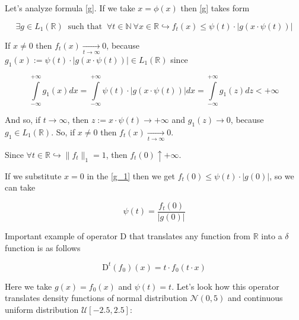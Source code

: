 \documentclass{article}
\begin{document}
    \newpage

    Let's analyze formula \eqref{g}. If we take $x = \phi(x)$ then \eqref{g} takes form 
    
    \begin{equation} \label{g_1}
            \exists g \in L_1(\mathbb{R}) ~\text{ such that }~ \forall t \in \mathbb{N} ~\forall x \in \mathbb{R} \hookrightarrow f_t\left(x\right) \leq \psi(t) \cdot |g(x \cdot \psi(t))|
    \end{equation}

    If $x \neq 0$ then $f_t(x) \underset{t \to \infty}{\longrightarrow} 0$, because $g_1(x) := \psi(t) \cdot |g(x \cdot \psi(t))| \in L_1(\mathbb{R})$ since

    \begin{equation*}
        \int\limits_{-\infty}^{+\infty} g_1(x) dx = \int\limits_{-\infty}^{+\infty} \psi(t) \cdot |g(x \cdot \psi(t))| dx = \int\limits_{-\infty}^{+\infty} g_1(z) dz < +\infty
    \end{equation*}

    And so, if $t \to \infty$, then $z := x \cdot \psi(t) \to +\infty$ and $g_1(z) \to 0$, because $g_1 \in L_1(\mathbb{R})$. So, if $x \neq 0$ then $f_t(x) \underset{t \to \infty}{\longrightarrow} 0$.

    Since $\forall t \in \mathbb{R} \hookrightarrow \|f_t\|_1 = 1$, then $f_t(0) \uparrow +\infty$.

    If we substitute $x = 0$ in the \eqref{g_1} then we get $f_t(0) \leq \psi(t) \cdot |g(0)|$, so we can take

    \begin{equation}
        \psi(t) = \dfrac{f_t(0)}{|g(0)|}
    \end{equation}

    Important example of operator $\text{D}$ that translates any function from $\mathbb{R}$ into a $\delta$ function is as follows

    \begin{equation} \label{example1}
        \text{D}^t(f_0)(x) = t \cdot f_0(t \cdot x)
    \end{equation}

    Here we take $g(x) = f_0(x)$ and $\psi(t) = t$. Let's look how this operator translates density functions of normal distribution $\mathcal{N}(0, 5)$ and continuous uniform distribution $\mathcal{U}[-2.5, 2.5]$:
\end{document}
